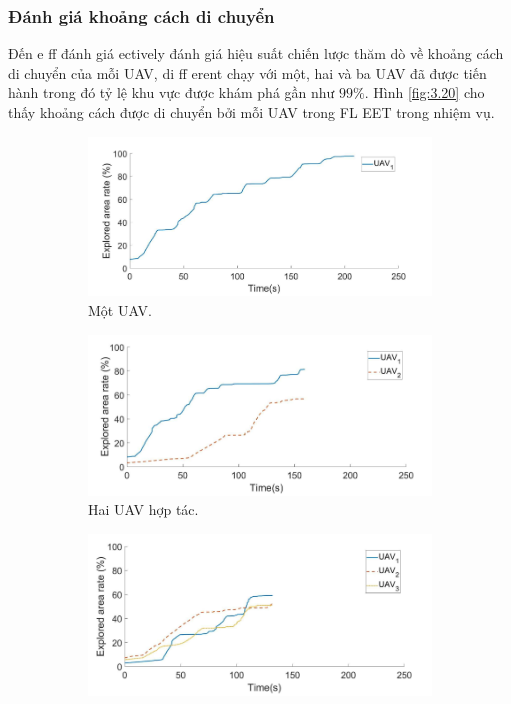 \documentclass[11pt,openany]{book}
\begin{document}
\begin{algorimth}[H]
\subsubsection{Đánh giá khoảng cách di chuyển}
Đến e ff đánh giá ectively đánh giá hiệu suất chiến lược thăm dò về khoảng cách di chuyển của mỗi UAV, di ff erent chạy với một, hai và ba UAV đã được tiến hành trong đó tỷ lệ khu vực được khám phá gần như $99\%$. Hình \ref{fig:3.20} cho thấy khoảng cách được di chuyển bởi mỗi UAV trong FL EET trong nhiệm vụ.
\begin{figure}[H]
    \centering
    \begin{subfigure}[H]{0.7\linewidth}
        \includegraphics[chiều rộng=\linewidth]{assets/3_18_a.png}
        \caption{{Một UAV.}}
        \label{fig:3.18a}
    \end{subfigure}
    \begin{subfigure}[H]{0.7\linewidth}
        \includegraphics[chiều rộng=\linewidth]{assets/3_18_b.png}
        \caption{{Hai UAV hợp tác.}}
        \label{fig:3.18b}
    \end{subfigure}
    \begin{subfigure}[H]{0.7\linewidth}
        \includegraphics[chiều rộng=\linewidth]{assets/3_18_c.png}

\end{subfigure}
\end{figure}
\end{algorimth}
\end{document}
